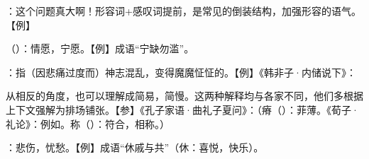 {
\item {}：这个问题真大啊！形容词+感叹词提前，是常见的倒装结构，加强形容的语气。【例】 
\item {}（）：情愿，宁愿。【例】成语“宁缺勿滥”。
\item {}：指（因悲痛过度而）神志混乱，变得魔魔怔怔的。【例】《韩非子·内储说下》：

从相反的角度，也可以理解成简易，简慢。这两种解释均与各家不同，他们多根据上下文强解为排场铺张。【参】《孔子家语·曲礼子夏问》：（瘠（）：菲薄。《荀子·礼论》：例如。称（）：符合，相称。）
\item {}：悲伤，忧愁。【例】成语“休戚与共”（休：喜悦，快乐）。
}
{}


